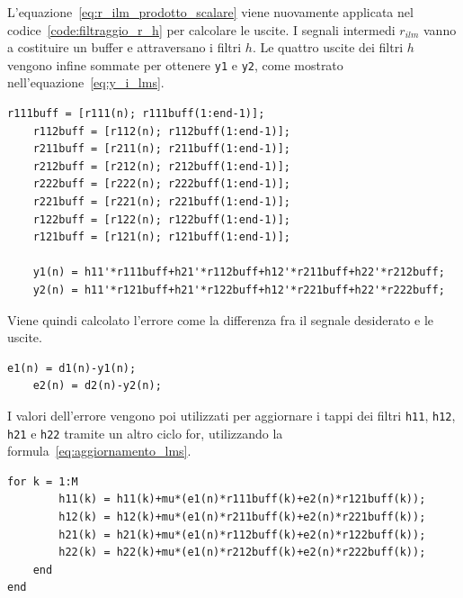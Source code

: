 \documentclass[12pt,a4paper,titlepage]{article}
\begin{document}
L'equazione~\eqref{eq:r_ilm_prodotto_scalare} viene nuovamente applicata nel codice~\ref{code:filtraggio_r_h} per calcolare le uscite. I segnali intermedi $r_{ilm}$ vanno a costituire un buffer e attraversano i filtri $h$. Le quattro uscite dei filtri $h$ vengono infine sommate per ottenere \texttt{y1} e \texttt{y2}, come mostrato nell'equazione~\eqref{eq:y_i_lms}.

\begin{lstlisting}[label=code:filtraggio_r_h, caption=Calcolo delle uscite, captionpos=b]
    r111buff = [r111(n); r111buff(1:end-1)];
    r112buff = [r112(n); r112buff(1:end-1)];
    r211buff = [r211(n); r211buff(1:end-1)];
    r212buff = [r212(n); r212buff(1:end-1)];
    r222buff = [r222(n); r222buff(1:end-1)];
    r221buff = [r221(n); r221buff(1:end-1)];
    r122buff = [r122(n); r122buff(1:end-1)];
    r121buff = [r121(n); r121buff(1:end-1)];
    
    y1(n) = h11'*r111buff+h21'*r112buff+h12'*r211buff+h22'*r212buff;
    y2(n) = h11'*r121buff+h21'*r122buff+h12'*r221buff+h22'*r222buff;
\end{lstlisting}

Viene quindi calcolato l'errore come la differenza fra il segnale desiderato e le uscite.

\begin{lstlisting}[label=code:calcolo_errore, caption=Calcolo dell'errore, captionpos=b]
    e1(n) = d1(n)-y1(n);
    e2(n) = d2(n)-y2(n);
\end{lstlisting}    


I valori dell'errore vengono poi utilizzati per aggiornare i tappi dei filtri \texttt{h11}, \texttt{h12}, \texttt{h21} e \texttt{h22} tramite un altro ciclo for, utilizzando la formula~\eqref{eq:aggiornamento_lms}.

\begin{lstlisting}[label=code:aggiornamento_filtro_lms, caption=Aggiornamento del filtro, captionpos=b]
    for k = 1:M
        h11(k) = h11(k)+mu*(e1(n)*r111buff(k)+e2(n)*r121buff(k));
        h12(k) = h12(k)+mu*(e1(n)*r211buff(k)+e2(n)*r221buff(k));
        h21(k) = h21(k)+mu*(e1(n)*r112buff(k)+e2(n)*r122buff(k));
        h22(k) = h22(k)+mu*(e1(n)*r212buff(k)+e2(n)*r222buff(k));
    end
end
\end{lstlisting}
\end{document}
